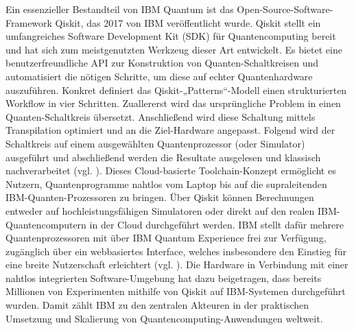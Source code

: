 Ein essenzieller Bestandteil von IBM Quantum ist das Open-Source-Software-Framework Qiskit, das 2017 von IBM veröffentlicht wurde. Qiskit stellt ein umfangreiches Software Development Kit (SDK) für Quantencomputing bereit und hat sich zum meistgenutzten Werkzeug dieser Art entwickelt. Es bietet eine benutzerfreundliche API zur Konstruktion von Quanten-Schaltkreisen und automatisiert die nötigen Schritte, um diese auf echter Quantenhardware auszuführen. Konkret definiert das Qiskit-„Patterns“-Modell einen strukturierten Workflow in vier Schritten. Zuallererst wird das ursprüngliche Problem in einen Quanten-Schaltkreis übersetzt. Anschließend wird diese Schaltung mittels Transpilation optimiert und an die Ziel-Hardware angepasst. Folgend wird der Schaltkreis auf einem ausgewählten Quantenprozessor (oder Simulator) ausgeführt und abschließend werden die Resultate ausgelesen und klassisch nachverarbeitet (vgl. \cite{abughanemIBMQuantumComputers2025}). Dieses Cloud-basierte Toolchain-Konzept ermöglicht es Nutzern, Quantenprogramme nahtlos vom Laptop bis auf die supraleitenden IBM-Quanten-Prozessoren zu bringen. Über Qiskit können Berechnungen entweder auf hochleistungsfähigen Simulatoren oder direkt auf den realen IBM-Quantencomputern in der Cloud durchgeführt werden. IBM stellt dafür mehrere Quantenprozessoren mit über IBM Quantum Experience frei zur Verfügung, zugänglich über ein webbasiertes Interface, welches insbesondere den Einstieg für eine breite Nutzerschaft erleichtert (vgl. \cite{wangAdvantagesTwoQuantum2025}). Die Hardware in Verbindung mit einer nahtlos integrierten Software-Umgebung hat dazu beigetragen, dass bereits Millionen von Experimenten mithilfe von Qiskit auf IBM-Systemen durchgeführt wurden. Damit zählt IBM zu den zentralen Akteuren in der praktischen Umsetzung und Skalierung von Quantencomputing-Anwendungen weltweit.

